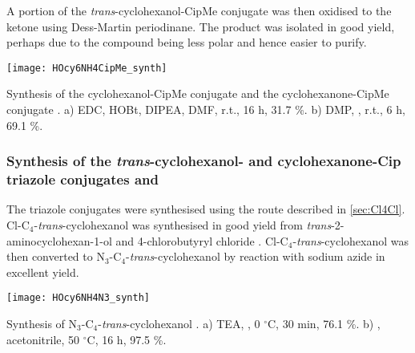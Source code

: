 A portion of the \textit{trans}-cyclohexanol-CipMe conjugate  was then oxidised to the ketone using Dess-Martin periodinane. The product was isolated in good yield, perhaps due to the compound being less polar and hence easier to purify.

\begin{scheme}[H]
	\begin{center}
		\texttt{[image: HOcy6NH4CipMe\_synth]}
		\caption{Synthesis of the cyclohexanol-CipMe conjugate  and the cyclohexanone-CipMe conjugate . 
		a) EDC, HOBt, DIPEA, DMF, r.t., 16 h, 31.7 \%.
		b) DMP, , r.t., 6 h, 69.1 \%.
		\label{sch:HOcy6NH4CipMe_synth}}
	\end{center}
\end{scheme}

\subsubsection{Synthesis of the \textit{trans}-cyclohexanol- and cyclohexanone-Cip triazole conjugates  and }

The triazole conjugates were synthesised using the route described in \ref{sec:Cl4Cl}. Cl-C$_4$-\textit{trans}-cyclohexanol  was synthesised in good yield from \textit{trans}-2-aminocyclohexan-1-ol  and 4-chlorobutyryl chloride . 
Cl-C$_4$-\textit{trans}-cyclohexanol  was then converted to N$_3$-C$_4$-\textit{trans}-cyclohexanol  by reaction with sodium azide in excellent yield. 

\begin{scheme}[H]
	\begin{center}
		\texttt{[image: HOcy6NH4N3\_synth]}
		\caption{Synthesis of N$_3$-C$_4$-\textit{trans}-cyclohexanol . 
		a) TEA, , 0 $^{\circ}$C, 30 min, 76.1 \%.
		b) , acetonitrile, 50 $^\circ$C, 16 h, 97.5 \%.
		\label{sch:HOcy6NH4N3_synth}}
	\end{center}
\end{scheme}

